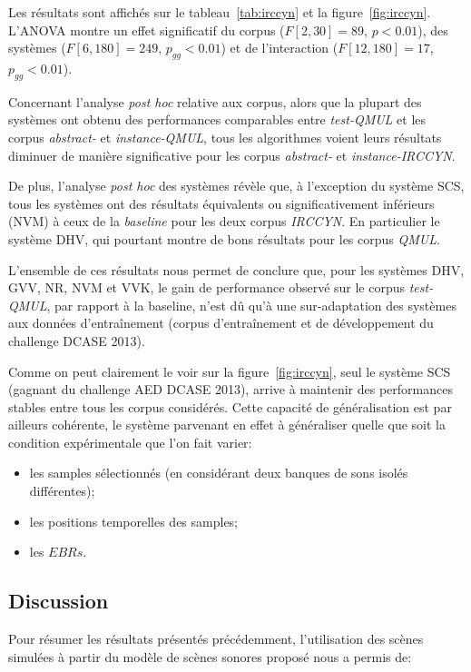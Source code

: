 Les résultats sont affichés sur le tableau~\ref{tab:irccyn} et la figure~\ref{fig:irccyn}. L'ANOVA montre un effet significatif du corpus ($F[2,30]=89$, $p<0.01$), des systèmes ($F[6,180]=249$, $p_{gg}<0.01$) et de l'interaction ($F[12,180]=17$, $p_{gg}<0.01$).

Concernant l'analyse \emph{post hoc} relative aux corpus, alors que la plupart des systèmes ont obtenu des performances comparables entre \emph{test-QMUL} et les corpus \emph{abstract-} et \emph{instance-QMUL}, tous les algorithmes voient leurs résultats diminuer de manière significative pour les corpus  \emph{abstract-} et \emph{instance-IRCCYN}.

De plus, l'analyse \emph{post hoc} des systèmes révèle que, à l'exception du système SCS, tous les systèmes ont des résultats équivalents ou significativement inférieurs (NVM) à ceux de la \emph{baseline} pour les deux corpus \emph{IRCCYN}. En particulier le système DHV, qui pourtant montre de bons résultats pour les corpus \emph{QMUL}.

L'ensemble de ces résultats nous permet de conclure que, pour les systèmes DHV, GVV, NR, NVM et VVK, le gain de performance observé sur le corpus \emph{test-QMUL}, par rapport à la baseline, n'est dû qu'à une sur-adaptation des systèmes aux données d'entraînement (corpus d'entraînement et de développement du challenge DCASE 2013). 

Comme on peut clairement le voir sur la figure~\ref{fig:irccyn}, seul le système SCS (gagnant du challenge AED DCASE 2013), arrive à maintenir des performances stables entre tous les corpus considérés. Cette capacité de généralisation est par ailleurs cohérente, le système parvenant en effet à généraliser quelle que soit la condition expérimentale que l'on fait varier: 

\begin{itemize}
\item les samples sélectionnés (en considérant deux banques de sons isolés différentes);
\item les positions temporelles des samples;
\item les $EBRs$.
\end{itemize}

\subsection{Discussion}

Pour résumer les résultats présentés précédemment, l'utilisation des scènes simulées à partir du modèle de scènes sonores proposé nous a permis de:

